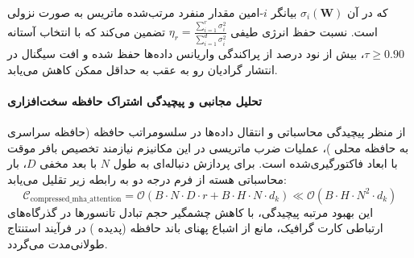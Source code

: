 که در آن $\sigma_i(\mathbf{W})$ بیانگر $i$-امین مقدار منفرد مرتب‌شده ماتریس به صورت نزولی است. نسبت حفظ انرژی طیفی $\eta_r = \frac{\sum_{i=1}^r \sigma_i^2}{\sum_{i=1}^{d} \sigma_i^2}$ تضمین می‌کند که با انتخاب آستانه $\tau \ge 0.90$، بیش از نود درصد از پراکندگی واریانس داده‌ها حفظ شده و افت سیگنال در انتشار گرادیان رو به عقب به حداقل ممکن کاهش می‌یابد.

\paragraph{تحلیل مجانبی و پیچیدگی اشتراک حافظه سخت‌افزاری}
از منظر پیچیدگی محاسباتی و انتقال داده‌ها در سلسومراتب حافظه (حافظه سراسری  به حافظه محلی )، عملیات ضرب ماتریسی در این مکانیزم نیازمند تخصیص بافر موقت با ابعاد فاکتورگیری‌شده است. برای پردازش دنباله‌ای به طول $N$ با بعد مخفی $D$، بار محاسباتی هسته از فرم درجه دو به رابطه زیر تقلیل می‌یابد:
\begin{equation}
\label{eq:complexity_compressed_mha_attention}
\mathcal{C}_{\text{compressed\_mha\_attention}} = \mathcal{O}\left( B \cdot N \cdot D \cdot r + B \cdot H \cdot N \cdot d_k \right) \ll \mathcal{O}\left( B \cdot H \cdot N^2 \cdot d_k \right)
\end{equation}
این بهبود مرتبه پیچیدگی، با کاهش چشمگیر حجم تبادل تانسورها در گذرگاه‌های ارتباطی کارت گرافیک، مانع از اشباع پهنای باند حافظه (پدیده ) در فرآیند استنتاج طولانی‌مدت می‌گردد.

